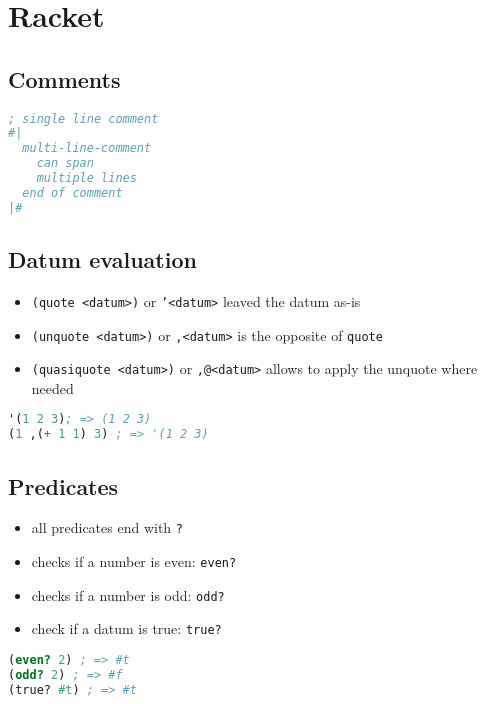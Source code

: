 \documentclass[a4paper,landscape,10pt]{article}
\begin{document}
\section{Racket}
\begin{multicols*}{2}
  \subsection{Comments}

  \begin{lstlisting}[language=Scheme]
; single line comment
#|
  multi-line-comment
	can span
	multiple lines
  end of comment
|#
\end{lstlisting}

  \subsection{Datum evaluation}

  \begin{itemize}
    \item \texttt{(quote <datum>)} or \texttt{'<datum>} leaved the datum as-is
    \item \texttt{(unquote <datum>)} or \texttt{,<datum>} is the opposite of \texttt{quote}
    \item \texttt{(quasiquote <datum>)} or \texttt{,@<datum>} allows to apply the unquote where needed
  \end{itemize}

  \begin{lstlisting}[language=Scheme]
'(1 2 3); => (1 2 3)
(1 ,(+ 1 1) 3) ; => '(1 2 3)
\end{lstlisting}

  \subsection{Predicates}

  \begin{itemize}
    \item all predicates end with \texttt{?}
    \item checks if a number is even: \texttt{even?}
    \item checks if a number is odd: \texttt{odd?}
    \item check if a datum is true: \texttt{true?}
  \end{itemize}

  \begin{lstlisting}[language=Scheme]
(even? 2) ; => #t
(odd? 2) ; => #f
(true? #t) ; => #t
\end{lstlisting}


\end{multicols*}
\end{document}
